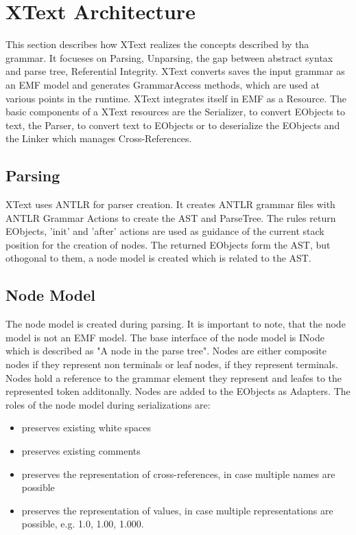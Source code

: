 \chapter{XText Architecture}
\label{cha:xtextarch}
This section describes how XText realizes the concepts described by tha grammar. It focueses on Parsing, Unparsing, the gap between abstract syntax and parse tree, Referential Integrity. 
XText converts saves the input grammar as an EMF model and generates GrammarAccess methods, which are used at various points in the runtime. XText integrates itself in EMF as a Resource.  The basic components of a XText resources are the Serializer, to convert EObjects to text, the Parser, to convert text to EObjects or to deserialize the EObjects and the Linker which manages Cross-References. 
\section{Parsing}
XText uses ANTLR for parser creation. It creates ANTLR grammar files with ANTLR Grammar Actions to create the AST and ParseTree. The rules return EObjects, 'init' and 'after' actions are used as guidance of the current stack position for the creation of nodes. The returned EObjects form the AST, but othogonal to them, a node model is created which is related to the AST. 

\section{Node Model}
The node model is created during parsing. It is important to note, that the node model is not an EMF model. The base interface of the node model is INode which  is described as "A node in the parse tree". Nodes are either composite nodes if they represent non terminals or leaf nodes, if they represent terminals. Nodes hold a reference to the grammar element they represent and leafes to the represented token additonally. Nodes are added to the EObjects as Adapters.
The roles of the node model during serializations are:
\begin{itemize}
	\item preserves existing white spaces
	\item preserves existing comments
	\item preserves the representation of cross-references, in case multiple names are possible
	\item preserves the representation of values, in case multiple representations are possible, e.g. 1.0, 1.00, 1.000.
\end{itemize}

